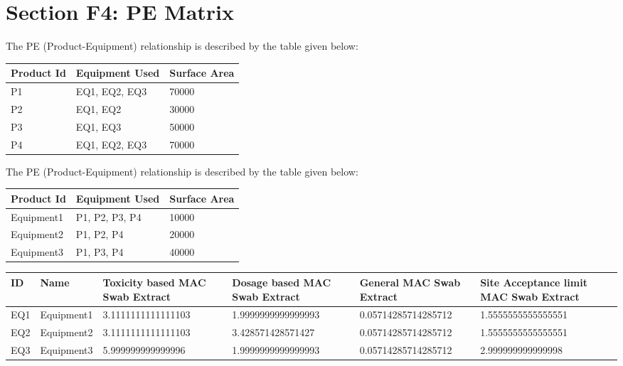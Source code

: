 \documentclass{article}
\begin{document}
        \section{Section F4: PE Matrix}
        The PE (Product-Equipment) relationship is described by the table given below:
        \begin{longtable}[l]{ |p{3cm} |p{5cm} |p{3cm}|}
        \hline

        Product Id & Equipment Used & Surface Area\\

        \hline

    P1 & EQ1, EQ2, EQ3 & 70000\\
\hline
P2 & EQ1, EQ2 & 30000\\
\hline
P3 & EQ1, EQ3 & 50000\\
\hline
P4 & EQ1, EQ2, EQ3 & 70000\\
\hline

    \end{longtable}
    The PE (Product-Equipment) relationship is described by the table given below:
    \begin{longtable}[l]{ |p{3cm} |p{5cm} |p{3cm}|}
    \hline

    Product Id & Equipment Used & Surface Area\\

    \hline

    Equipment1 & P1, P2, P3, P4 & 10000\\
\hline
Equipment2 & P1, P2, P4 & 20000\\
\hline
Equipment3 & P1, P3, P4 & 40000\\
\hline

    \end{longtable}
    
        \begin{longtable}[l]{|p{1.5cm}|p{2cm}|p{3cm}|p{3cm}|p{3cm}|p{3cm}|}

\hline
ID & Name & Toxicity based MAC Swab Extract & Dosage based MAC Swab Extract & General MAC Swab Extract  & Site Acceptance limit MAC Swab Extract\\
\hline

EQ1 & Equipment1 & 3.1111111111111103 & 1.9999999999999993 & 0.05714285714285712 & 1.5555555555555551\\
\hline
EQ2 & Equipment2 & 3.1111111111111103 & 3.428571428571427 & 0.05714285714285712 & 1.5555555555555551\\
\hline
EQ3 & Equipment3 & 5.999999999999996 & 1.9999999999999993 & 0.05714285714285712 & 2.999999999999998\\
\hline

    \end{longtable}
    
\end{document}
